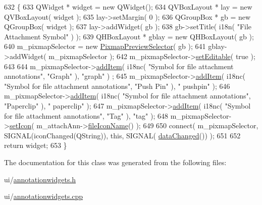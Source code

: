\begin{DoxyCode}
632 \{
633     QWidget * widget = \textcolor{keyword}{new} QWidget();
634     QVBoxLayout * lay = \textcolor{keyword}{new} QVBoxLayout( widget );
635     lay->setMargin( 0 );
636     QGroupBox * gb = \textcolor{keyword}{new} QGroupBox( widget );
637     lay->addWidget( gb );
638     gb->setTitle( i18n( \textcolor{stringliteral}{"File Attachment Symbol"} ) );
639     QHBoxLayout * gblay = \textcolor{keyword}{new} QHBoxLayout( gb );
640     m\_pixmapSelector = \textcolor{keyword}{new} \hyperlink{classPixmapPreviewSelector}{PixmapPreviewSelector}( gb );
641     gblay->addWidget( m\_pixmapSelector );
642     m\_pixmapSelector->\hyperlink{classPixmapPreviewSelector_a0adf1797472299f46c16f4ba881a1cc3}{setEditable}( \textcolor{keyword}{true} );
643 
644     m\_pixmapSelector->\hyperlink{classPixmapPreviewSelector_ac4729c46cc585aba462dd2eebcb74a92}{addItem}( i18nc( \textcolor{stringliteral}{"Symbol for file attachment annotations"}, \textcolor{stringliteral}{"Graph"} ), \textcolor{stringliteral}{"graph"} )
      ;
645     m\_pixmapSelector->\hyperlink{classPixmapPreviewSelector_ac4729c46cc585aba462dd2eebcb74a92}{addItem}( i18nc( \textcolor{stringliteral}{"Symbol for file attachment annotations"}, \textcolor{stringliteral}{"Push Pin"} ), \textcolor{stringliteral}{"
      pushpin"} );
646     m\_pixmapSelector->\hyperlink{classPixmapPreviewSelector_ac4729c46cc585aba462dd2eebcb74a92}{addItem}( i18nc( \textcolor{stringliteral}{"Symbol for file attachment annotations"}, \textcolor{stringliteral}{"Paperclip"} ), \textcolor{stringliteral}{"
      paperclip"} );
647     m\_pixmapSelector->\hyperlink{classPixmapPreviewSelector_ac4729c46cc585aba462dd2eebcb74a92}{addItem}( i18nc( \textcolor{stringliteral}{"Symbol for file attachment annotations"}, \textcolor{stringliteral}{"Tag"} ), \textcolor{stringliteral}{"tag"} );
648     m\_pixmapSelector->\hyperlink{classPixmapPreviewSelector_a9ba6710637ffc9b0f5c8eac83aaec671}{setIcon}( m\_attachAnn->\hyperlink{classOkular_1_1FileAttachmentAnnotation_a8167c8dbf60abfe03b7413bf65b35957}{fileIconName}() );
649 
650     connect( m\_pixmapSelector, SIGNAL(iconChanged(QString)), \textcolor{keyword}{this}, SIGNAL(
      \hyperlink{classAnnotationWidget_af9dcb02a8b69a602225c9844b5deb6d4}{dataChanged}()) );
651 
652     \textcolor{keywordflow}{return} widget;
653 \}
\end{DoxyCode}


The documentation for this class was generated from the following files\+:\begin{DoxyCompactItemize}
\item 
ui/\hyperlink{annotationwidgets_8h}{annotationwidgets.\+h}\item 
ui/\hyperlink{annotationwidgets_8cpp}{annotationwidgets.\+cpp}\end{DoxyCompactItemize}
